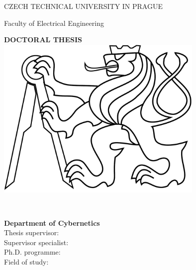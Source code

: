 \begin{titlepage}
  \begin{center}

    {\Large CZECH TECHNICAL UNIVERSITY IN PRAGUE}
    \vskip 10pt

    \vskip 8pt
    {\Large Faculty of Electrical Engineering}

    \vspace{50pt}
    {\Huge\bf DOCTORAL THESIS}\\
    \vspace{40pt}
    \includegraphics[width=10cm]{fig/lev.pdf}

    \vspace{40pt}
    {\Large\rm \Author}\\
    \vspace{20pt}
    {\Large\bf \Title}

    \vspace{50pt}
    {\bf Department of Cybernetics}\\
    \vspace{5pt}
    {Thesis supervisor: {\bf \Supervisor}}\\
    \vspace{5pt}
    {Supervisor specialist: {\bf \Specialist}}\\
    \vspace{5pt}
    {Ph.D. programme: {\bf \Programme}}\\
    \vspace{5pt}
    {Field of study: {\bf \Field}}

    \vspace{30pt}

  \end{center}
\end{titlepage}
